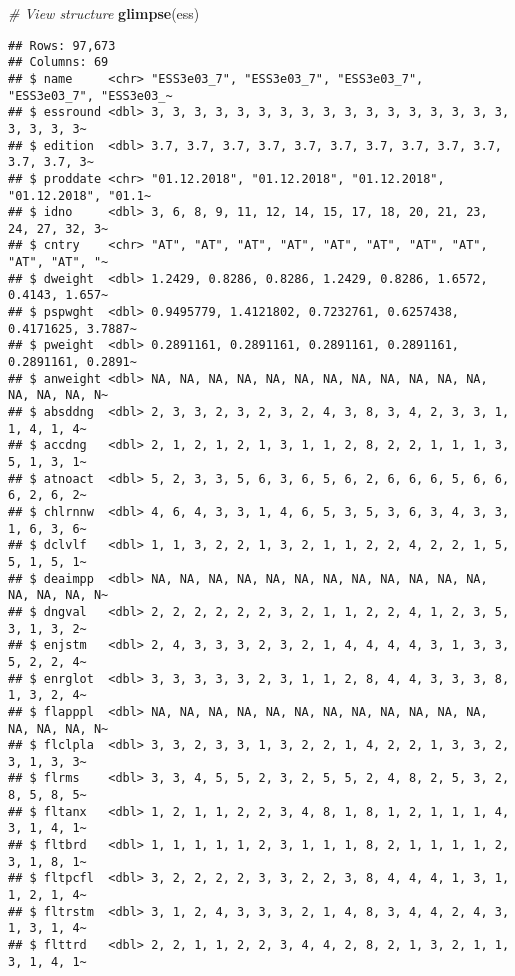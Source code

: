 \documentclass[
]{article}
\newenvironment{Shaded}{\begin{snugshade}}{\end{snugshade}}
\newcommand{\CommentTok}[1]{\textcolor[rgb]{0.56,0.35,0.01}{\textit{#1}}}
\newcommand{\FunctionTok}[1]{\textcolor[rgb]{0.13,0.29,0.53}{\textbf{#1}}}
\newcommand{\NormalTok}[1]{#1}
\begin{document}
\begin{Shaded}
\begin{Highlighting}[]
\CommentTok{\# View structure}
\FunctionTok{glimpse}\NormalTok{(ess)}
\end{Highlighting}
\end{Shaded}

\begin{verbatim}
## Rows: 97,673
## Columns: 69
## $ name     <chr> "ESS3e03_7", "ESS3e03_7", "ESS3e03_7", "ESS3e03_7", "ESS3e03_~
## $ essround <dbl> 3, 3, 3, 3, 3, 3, 3, 3, 3, 3, 3, 3, 3, 3, 3, 3, 3, 3, 3, 3, 3~
## $ edition  <dbl> 3.7, 3.7, 3.7, 3.7, 3.7, 3.7, 3.7, 3.7, 3.7, 3.7, 3.7, 3.7, 3~
## $ proddate <chr> "01.12.2018", "01.12.2018", "01.12.2018", "01.12.2018", "01.1~
## $ idno     <dbl> 3, 6, 8, 9, 11, 12, 14, 15, 17, 18, 20, 21, 23, 24, 27, 32, 3~
## $ cntry    <chr> "AT", "AT", "AT", "AT", "AT", "AT", "AT", "AT", "AT", "AT", "~
## $ dweight  <dbl> 1.2429, 0.8286, 0.8286, 1.2429, 0.8286, 1.6572, 0.4143, 1.657~
## $ pspwght  <dbl> 0.9495779, 1.4121802, 0.7232761, 0.6257438, 0.4171625, 3.7887~
## $ pweight  <dbl> 0.2891161, 0.2891161, 0.2891161, 0.2891161, 0.2891161, 0.2891~
## $ anweight <dbl> NA, NA, NA, NA, NA, NA, NA, NA, NA, NA, NA, NA, NA, NA, NA, N~
## $ absddng  <dbl> 2, 3, 3, 2, 3, 2, 3, 2, 4, 3, 8, 3, 4, 2, 3, 3, 1, 1, 4, 1, 4~
## $ accdng   <dbl> 2, 1, 2, 1, 2, 1, 3, 1, 1, 2, 8, 2, 2, 1, 1, 1, 3, 5, 1, 3, 1~
## $ atnoact  <dbl> 5, 2, 3, 3, 5, 6, 3, 6, 5, 6, 2, 6, 6, 6, 5, 6, 6, 6, 2, 6, 2~
## $ chlrnnw  <dbl> 4, 6, 4, 3, 3, 1, 4, 6, 5, 3, 5, 3, 6, 3, 4, 3, 3, 1, 6, 3, 6~
## $ dclvlf   <dbl> 1, 1, 3, 2, 2, 1, 3, 2, 1, 1, 2, 2, 4, 2, 2, 1, 5, 5, 1, 5, 1~
## $ deaimpp  <dbl> NA, NA, NA, NA, NA, NA, NA, NA, NA, NA, NA, NA, NA, NA, NA, N~
## $ dngval   <dbl> 2, 2, 2, 2, 2, 2, 3, 2, 1, 1, 2, 2, 4, 1, 2, 3, 5, 3, 1, 3, 2~
## $ enjstm   <dbl> 2, 4, 3, 3, 3, 2, 3, 2, 1, 4, 4, 4, 4, 3, 1, 3, 3, 5, 2, 2, 4~
## $ enrglot  <dbl> 3, 3, 3, 3, 3, 2, 3, 1, 1, 2, 8, 4, 4, 3, 3, 3, 8, 1, 3, 2, 4~
## $ flapppl  <dbl> NA, NA, NA, NA, NA, NA, NA, NA, NA, NA, NA, NA, NA, NA, NA, N~
## $ flclpla  <dbl> 3, 3, 2, 3, 3, 1, 3, 2, 2, 1, 4, 2, 2, 1, 3, 3, 2, 3, 1, 3, 3~
## $ flrms    <dbl> 3, 3, 4, 5, 5, 2, 3, 2, 5, 5, 2, 4, 8, 2, 5, 3, 2, 8, 5, 8, 5~
## $ fltanx   <dbl> 1, 2, 1, 1, 2, 2, 3, 4, 8, 1, 8, 1, 2, 1, 1, 1, 4, 3, 1, 4, 1~
## $ fltbrd   <dbl> 1, 1, 1, 1, 1, 2, 3, 1, 1, 1, 8, 2, 1, 1, 1, 1, 2, 3, 1, 8, 1~
## $ fltpcfl  <dbl> 3, 2, 2, 2, 2, 3, 3, 2, 2, 3, 8, 4, 4, 4, 1, 3, 1, 1, 2, 1, 4~
## $ fltrstm  <dbl> 3, 1, 2, 4, 3, 3, 3, 2, 1, 4, 8, 3, 4, 4, 2, 4, 3, 1, 3, 1, 4~
## $ flttrd   <dbl> 2, 2, 1, 1, 2, 2, 3, 4, 4, 2, 8, 2, 1, 3, 2, 1, 1, 3, 1, 4, 1~

\end{verbatim}
\end{document}
